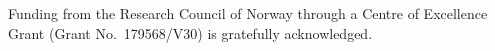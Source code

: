 \ack

Funding from the Research
Council of Norway through a Centre of Excellence Grant (Grant No.\ 179568/V30)
is gratefully acknowledged.
